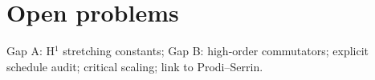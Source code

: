 \section{Open problems}
Gap A: H$^1$ stretching constants; Gap B: high-order commutators; explicit schedule audit; critical scaling; link to Prodi--Serrin.
